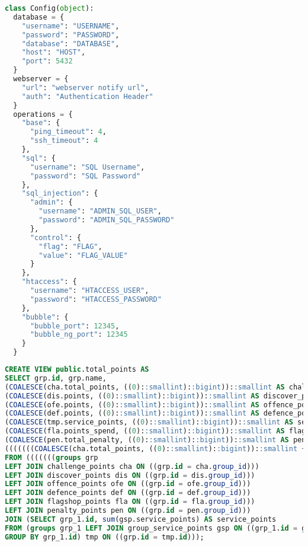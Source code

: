 \begin{lstlisting}[frame=single, language=python, caption={Config Vorlage Big Brother}, captionpos=b, label={lst:anhang-bigbrother-config-example}]
class Config(object):
  database = {
    "username": "USERNAME",
    "password": "PASSWORD",
    "database": "DATABASE",
    "host": "HOST",
    "port": 5432
  }
  webserver = {
    "url": "webserver notify url",
    "auth": "Authentication Header"
  }
  operations = {
    "base": {
      "ping_timeout": 4,
      "ssh_timeout": 4
    },
    "sql": {
      "username": "SQL Username",
      "password": "SQL Password"
    },
    "sql_injection": {
      "admin": {
        "username": "ADMIN_SQL_USER",
        "password": "ADMIN_SQL_PASSWORD"
	  },
	  "control": {
	    "flag": "FLAG",
	    "value": "FLAG_VALUE"
	  }
    },
    "htaccess": {
      "username": "HTACCESS_USER",
      "password": "HTACCESS_PASSWORD"
    },
    "bubble": {
      "bubble_port": 12345,
      "bubble_ng_port": 12345
    }
  }
\end{lstlisting}
\begin{lstlisting}[frame=single, language=sql, caption={SQL View Gesamtpunkte}, captionpos=b, label={lst:databas-total-points-sql}]
CREATE VIEW public.total_points AS 
SELECT grp.id, grp.name, 
(COALESCE(cha.total_points, ((0)::smallint)::bigint))::smallint AS challenge_points,
(COALESCE(dis.points, ((0)::smallint)::bigint))::smallint AS discover_points,
(COALESCE(ofe.points, ((0)::smallint)::bigint))::smallint AS offence_points,
(COALESCE(def.points, ((0)::smallint)::bigint))::smallint AS defence_points,
(COALESCE(tmp.service_points, ((0)::smallint)::bigint))::smallint AS service_points,
(COALESCE(fla.points_spend, ((0)::smallint)::bigint))::smallint AS flagsshop_points,
(COALESCE(pen.total_penalty, ((0)::smallint)::bigint))::smallint AS penalty_points,
(((((((COALESCE(cha.total_points, ((0)::smallint)::bigint))::smallint + (COALESCE(dis.points, ((0)::smallint)::bigint))::smallint) + (COALESCE(ofe.points, ((0)::smallint)::bigint))::smallint) - (COALESCE(def.points, ((0)::smallint)::bigint))::smallint) - (COALESCE(tmp.service_points, ((0)::smallint)::bigint))::smallint) - (COALESCE(fla.points_spend, ((0)::smallint)::bigint))::smallint) - (COALESCE(pen.total_penalty, ((0)::smallint)::bigint))::smallint) AS total_points
FROM (((((((groups grp 
LEFT JOIN challenge_points cha ON ((grp.id = cha.group_id)))
LEFT JOIN discover_points dis ON ((grp.id = dis.group_id)))
LEFT JOIN offence_points ofe ON ((grp.id = ofe.group_id)))
LEFT JOIN defence_points def ON ((grp.id = def.group_id)))
LEFT JOIN flagshop_points fla ON ((grp.id = fla.group_id)))
LEFT JOIN penalty_points pen ON ((grp.id = pen.group_id)))
JOIN (SELECT grp_1.id, sum(gsp.service_points) AS service_points
FROM (groups grp_1 LEFT JOIN group_service_points gsp ON ((grp_1.id = gsp.group_id))) 
GROUP BY grp_1.id) tmp ON ((grp.id = tmp.id)));
\end{lstlisting}
